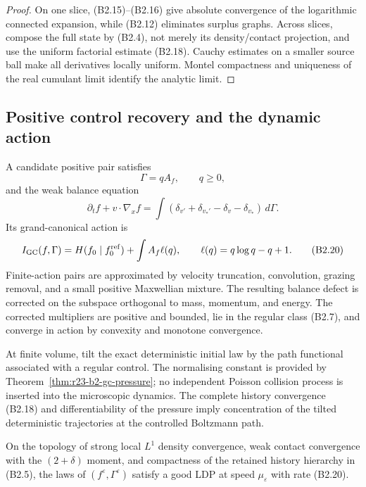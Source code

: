 \begin{proof}
On one slice, (B2.15)--(B2.16) give absolute convergence of the logarithmic
connected expansion, while (B2.12) eliminates surplus graphs.  Across slices,
compose the full state by (B2.4), not merely its density/contact projection,
and use the uniform factorial estimate (B2.18).  Cauchy estimates on a smaller
source ball make all derivatives locally uniform.  Montel compactness and
uniqueness of the real cumulant limit identify the analytic limit.
\end{proof}

\subsection{Positive control recovery and the dynamic action}

A candidate positive pair satisfies
\[
 \Gamma=qA_f,\qquad q\ge0,
\]
and the weak balance equation
\[
 \partial_tf+v\cdot\nabla_xf
 =\int(\delta_{v'}+\delta_{v_*'}-
        \delta_v-\delta_{v_*})\,d\Gamma .                \tag{B2.19}
\]
Its grand-canonical action is
\[
 I_{\rm GC}(f,\Gamma)
 =H(f_0\mid f_0^{\rm ref})+
   \int A_f\ell(q),\qquad
 \ell(q)=q\log q-q+1 .                                  \tag{B2.20}
\]
Finite-action pairs are approximated by velocity truncation, convolution,
grazing removal, and a small positive Maxwellian mixture.  The resulting
balance defect is corrected on the subspace orthogonal to mass, momentum, and
energy.  The corrected multipliers are positive and bounded, lie in the
regular class (B2.7), and converge in action by convexity and monotone
convergence.

At finite volume, tilt the exact deterministic initial law by the path
functional associated with a regular control.  The normalising constant is
provided by Theorem~\ref{thm:r23-b2-gc-pressure}; no independent Poisson
collision process is inserted into the microscopic dynamics.  The complete
history convergence (B2.18) and differentiability of the pressure imply
concentration of the tilted deterministic trajectories at the controlled
Boltzmann path.

\begin{theorem}
\label{thm:r23-b2-gc-ldp}
On the topology of strong local $L^1$ density convergence, weak contact
convergence with the $(2+\delta)$ moment, and compactness of the retained
history hierarchy in (B2.5), the laws of
$(f^\varepsilon,\Gamma^\varepsilon)$ satisfy a good LDP at speed
$\mu_\varepsilon$ with rate (B2.20).
\end{theorem}

